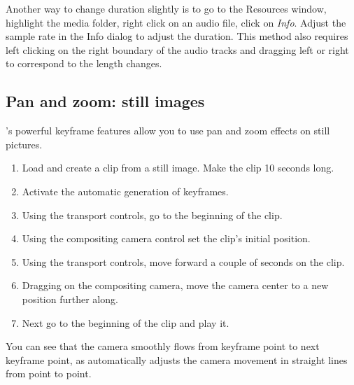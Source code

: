Another way to change duration slightly is to go to the Resources window, highlight the media folder, right click on an audio file, click on \textit{Info}. Adjust the sample rate in the Info dialog to adjust the duration. This method also requires left clicking on the right boundary of the audio tracks and dragging left or right to correspond to the length changes.

\subsection{Pan and zoom: still images}%
\label{sub:pan_zoom_still_image}

\CGG{}'s powerful keyframe features allow you to use pan and zoom effects on still pictures.

\begin{enumerate}
	\item Load and create a clip from a still image. Make the clip 10 seconds long.
	\item Activate the automatic generation of keyframes.
	\item Using the transport controls, go to the beginning of the clip.
	\item Using the compositing camera control set the clip's initial position.
	\item Using the transport controls, move forward a couple of seconds on the clip.
	\item Dragging on the compositing camera, move the camera center to a new position further along.
	\item Next go to the beginning of the clip and play it.
\end{enumerate}

You can see that the camera smoothly flows from keyframe point to next keyframe point, as \CGG{} automatically adjusts the camera movement in straight lines from point to point.

